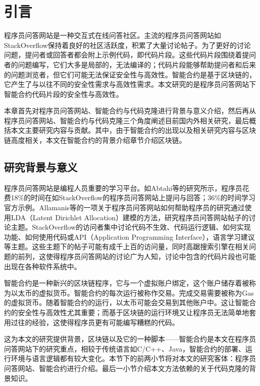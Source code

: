 
\chapter{引言}

程序员问答网站是一种交互式在线问答社区。主流的程序员问答网站如StackOverflow保持着良好的社区活跃度，积累了大量讨论帖子。为了更好的讨论问题，提问者或回答者都会附上示例代码，即代码片段。这些代码片段围绕着提问者的问题编写，它们大多是局部的，无法编译的；代码片段能够帮助提问者和后来的问题浏览者，但它们可能无法保证安全性与高效性。智能合约是基于区块链的，它产生了与以往不同的安全性需求与高效性需求。本文研究的是程序员问答网站下智能合约代码片段的安全性与高效性。

本章首先对程序员问答网站、智能合约与代码克隆进行背景与意义介绍，然后再从程序员问答网站、智能合约与代码克隆三个角度阐述目前国内外相关研究，最后概括本文主要研究内容与贡献。其中，由于智能合约的出现以及相关研究内容与区块链高度相关，本文在智能合约的背景介绍章节介绍区块链。

\section{研究背景与意义}

程序员问答网站是编程人员重要的学习平台。如Abtahi等\cite{learnRust}的研究所示，程序员花费18\%的时间在如StackOverflow的程序员问答网站上提问与回答；36\%的时间学习官方示例。Allamanis等\cite{LDAso}的一项关于程序员问答网站如何帮助程序员的研究通过使用LDA（Latent Dirichlet Allocation）建模的方法，研究程序员问答网站帖子的讨论主题。StackOverflow的访问者集中讨论代码不生效、代码运行逻辑、如何实现功能、如何使用代码或API（Application Programming Interface），语言学习建议等主题。这些主题下的帖子可能有成千上百的访问量，同时高踞搜索引擎在相关问题的前列，这使得程序员问答网站的讨论广为人知，讨论中包含的代码片段也可能出现在各种软件系统中。

智能合约是一种新兴的区块链程序，它与一个虚拟账户绑定，这个账户储存着被称为以太币的虚拟货币。智能合约的每次运行被称作交易。完成交易需要被称为Gas的虚拟货币。随着智能合约的运行，以太币可能会交易到其他账户中。这让智能合约的安全性与高效性尤其重要；而基于区块链的运行环境又让程序员无法简单地套用过往的经验，这使得程序员更有可能编写糟糕的代码。

这为本文的研究提供背景，区块链以及它的一种脚本——智能合约是本文在程序员问答网站下的研究重点，相较于传统语言如C/C++、Java，智能合约的部署、运行环境与语言逻辑都有较大变化。本节下的前两小节将对本文的研究客体：程序员问答网站、智能合约进行介绍。最后一小节介绍本文方法依赖的关于代码克隆的背景知识。

